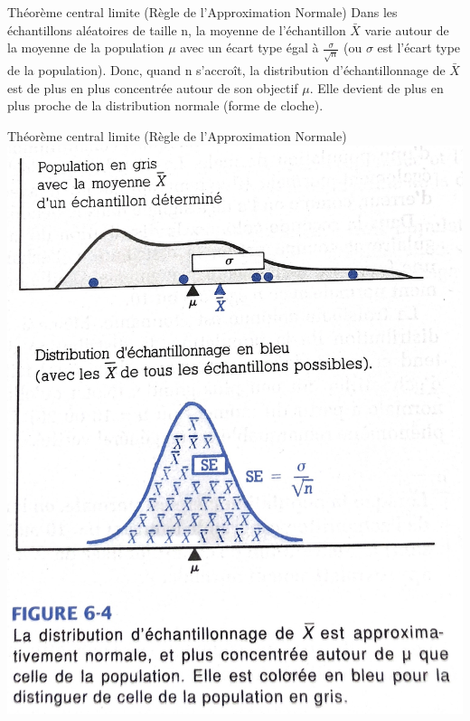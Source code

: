 \documentclass[
  ignorenonframetext,
]{beamer}
\begin{document}
\begin{frame}{Théorème central limite (Règle de l'Approximation
Normale)}
\protect\hypertarget{thuxe9oruxe8me-central-limite-ruxe8gle-de-lapproximation-normale}{}
Dans les échantillons aléatoires de taille n, la moyenne de
l'échantillon \(\bar{X}\) varie autour de la moyenne de la population
\(\mu\) avec un écart type égal à \(\frac{\sigma}{\sqrt{n}}\) (ou
\(\sigma\) est l'écart type de la population). Donc, quand n s'accroît,
la distribution d'échantillonnage de \(\bar{X}\) est de plus en plus
concentrée autour de son objectif \(\mu\). Elle devient de plus en plus
proche de la distribution normale (forme de cloche).
\end{frame}

\begin{frame}{Théorème central limite (Règle de l'Approximation
Normale)}
\protect\hypertarget{thuxe9oruxe8me-central-limite-ruxe8gle-de-lapproximation-normale-1}{}
\includegraphics{../Images/tcl.jpg}
\end{frame}
\end{document}
